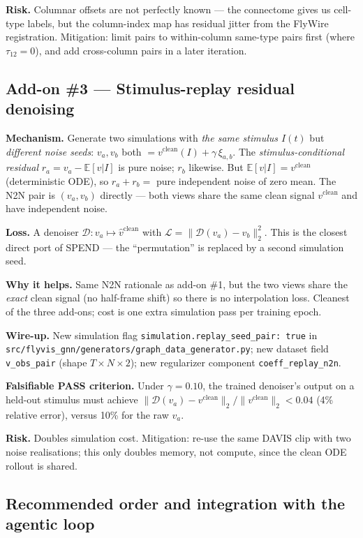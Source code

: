 \documentclass[11pt]{article}
\begin{document}
\textbf{Risk.} Columnar offsets are not perfectly known --- the connectome
gives us cell-type labels, but the column-index map has residual jitter from
the FlyWire registration. Mitigation: limit pairs to within-column same-type
pairs first (where $\tau_{12} = 0$), and add cross-column pairs in a
later iteration.

\subsection{Add-on \#3 --- Stimulus-replay residual denoising}

\textbf{Mechanism.} Generate two simulations with \emph{the same stimulus
$I(t)$} but \emph{different noise seeds}:
$v_a, v_b$ both $= v^{\text{clean}}(I) + \gamma\,\xi_{a,b}$. The
\emph{stimulus-conditional residual} $r_a = v_a - \mathbb E[v|I]$ is pure
noise; $r_b$ likewise. But $\mathbb E[v|I] = v^{\text{clean}}$ (deterministic
ODE), so $r_a + r_b = $ pure independent noise of zero mean. The N2N pair
is $(v_a, v_b)$ directly --- both views share the same clean signal
$v^{\text{clean}}$ and have independent noise.

\textbf{Loss.} A denoiser $\mathcal D: v_a \mapsto \widehat v^{\text{clean}}$
with $\mathcal L = \|\mathcal D(v_a) - v_b\|_2^2$. This is the closest
direct port of SPEND --- the ``permutation'' is replaced by a second
simulation seed.

\textbf{Why it helps.} Same N2N rationale as add-on \#1, but the two views
share the \emph{exact} clean signal (no half-frame shift) so there is no
interpolation loss. Cleanest of the three add-ons; cost is one extra
simulation pass per training epoch.

\textbf{Wire-up.} New simulation flag
\texttt{simulation.replay\_seed\_pair: true} in
\texttt{src/flyvis\_gnn/generators/graph\_data\_generator.py}; new dataset
field \texttt{v\_obs\_pair} (shape $T \times N \times 2$); new regularizer
component \texttt{coeff\_replay\_n2n}.

\textbf{Falsifiable PASS criterion.} Under
$\gamma=0.10$, the trained denoiser's output on a held-out
stimulus must achieve $\|\mathcal D(v_a) - v^{\text{clean}}\|_2 / \|v^{\text{clean}}\|_2
< 0.04$ (4\% relative error), versus 10\% for the raw $v_a$.

\textbf{Risk.} Doubles simulation cost. Mitigation: re-use the same DAVIS
clip with two noise realisations; this only doubles memory, not
compute, since the clean ODE rollout is shared.

\subsection{Recommended order and integration with the agentic loop}
\end{document}
